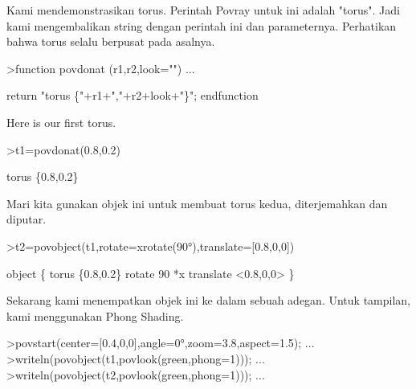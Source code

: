 \documentclass{article}
\begin{document}
\begin{eulernotebook}
\begin{eulercomment}
\begin{eulercomment}
\begin{eulercomment}
\begin{eulercomment}
\begin{eulercomment}
\begin{eulercomment}
\begin{eulercomment}
\begin{eulercomment}
\begin{eulercomment}
\begin{eulercomment}
\begin{eulercomment}
\begin{eulercomment}
\begin{eulercomment}
\begin{eulercomment}
\begin{eulercomment}
\begin{eulercomment}
\begin{eulercomment}
\begin{eulercomment}
\begin{eulercomment}
\begin{eulercomment}
\begin{eulercomment}
\begin{eulercomment}
\begin{eulercomment}
\begin{eulercomment}
\begin{eulercomment}
\begin{eulercomment}
\begin{eulercomment}
\begin{eulercomment}
\begin{eulercomment}
\begin{eulercomment}
\begin{eulercomment}
Kami mendemonstrasikan torus. Perintah Povray untuk ini adalah
"torus". Jadi kami mengembalikan string dengan perintah ini dan
parameternya. Perhatikan bahwa torus selalu berpusat pada asalnya.
\end{eulercomment}
\begin{eulerprompt}
>function povdonat (r1,r2,look="") ...
\end{eulerprompt}
\begin{eulerudf}
    return "torus \{"+r1+","+r2+look+"\}";
  endfunction
\end{eulerudf}
\begin{eulercomment}
Here is our first torus.
\end{eulercomment}
\begin{eulerprompt}
>t1=povdonat(0.8,0.2)
\end{eulerprompt}
\begin{euleroutput}
  torus \{0.8,0.2\}
\end{euleroutput}
\begin{eulercomment}
Mari kita gunakan objek ini untuk membuat torus kedua, diterjemahkan
dan diputar.
\end{eulercomment}
\begin{eulerprompt}
>t2=povobject(t1,rotate=xrotate(90°),translate=[0.8,0,0])
\end{eulerprompt}
\begin{euleroutput}
  object \{ torus \{0.8,0.2\}
   rotate 90 *x 
   translate <0.8,0,0>
   \}
\end{euleroutput}
\begin{eulercomment}
Sekarang kami menempatkan objek ini ke dalam sebuah adegan. Untuk
tampilan, kami menggunakan Phong Shading.
\end{eulercomment}
\begin{eulerprompt}
>povstart(center=[0.4,0,0],angle=0°,zoom=3.8,aspect=1.5); ...
>writeln(povobject(t1,povlook(green,phong=1))); ...
>writeln(povobject(t2,povlook(green,phong=1))); ...
\end{eulerprompt}

\end{eulercomment}
\end{eulercomment}
\end{eulercomment}
\end{eulercomment}
\end{eulercomment}
\end{eulercomment}
\end{eulercomment}
\end{eulercomment}
\end{eulercomment}
\end{eulercomment}
\end{eulercomment}
\end{eulercomment}
\end{eulercomment}
\end{eulercomment}
\end{eulercomment}
\end{eulercomment}
\end{eulercomment}
\end{eulercomment}
\end{eulercomment}
\end{eulercomment}
\end{eulercomment}
\end{eulercomment}
\end{eulercomment}
\end{eulercomment}
\end{eulercomment}
\end{eulercomment}
\end{eulercomment}
\end{eulercomment}
\end{eulercomment}
\end{eulercomment}
\end{eulernotebook}
\end{document}
